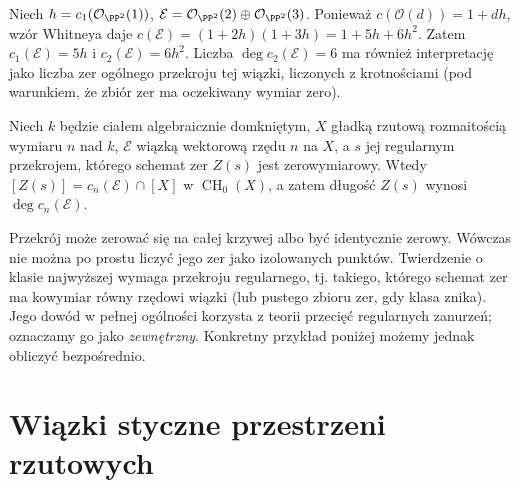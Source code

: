\begin{przyklad}
\label{prz:ga7-chern-sum}
Niech $h=c_1(\mathcal O_{\PP^2}(1))$,
$\mathcal E=\mathcal O_{\PP^2}(2)\oplus\mathcal O_{\PP^2}(3)$.
Ponieważ $c(\mathcal O(d))=1+dh$, wzór Whitneya daje
$c(\mathcal E)=(1+2h)(1+3h)=1+5h+6h^2$.
Zatem $c_1(\mathcal E)=5h$ i $c_2(\mathcal E)=6h^2$.
Liczba $\deg c_2(\mathcal E)=6$ ma również
interpretację jako liczba zer ogólnego przekroju
tej wiązki, liczonych z krotnościami (pod warunkiem,
że zbiór zer ma oczekiwany wymiar zero).
\end{przyklad}

\begin{stwierdzenie}
\label{st:ga7-zero-section}
Niech $k$ będzie ciałem algebraicznie domkniętym,
$X$ gładką rzutową rozmaitością wymiaru $n$ nad $k$,
$\mathcal E$ wiązką wektorową rzędu $n$ na $X$,
a $s$ jej regularnym przekrojem, którego schemat zer
$Z(s)$ jest zerowymiarowy. Wtedy
$[Z(s)]=c_n(\mathcal E)\cap[X]$ w $\operatorname{CH}_0(X)$,
a zatem długość $Z(s)$ wynosi $\deg c_n(\mathcal E)$.
\end{stwierdzenie}
\begin{uwaga}
Przekrój może zerować się na całej krzywej albo
być identycznie zerowy. Wówczas nie można po prostu
liczyć jego zer jako izolowanych punktów. Twierdzenie
o klasie najwyższej wymaga przekroju regularnego,
tj. takiego, którego schemat zer ma kowymiar równy
rzędowi wiązki (lub pustego zbioru zer, gdy klasa znika).
Jego dowód w pełnej ogólności korzysta z teorii
przecięć regularnych zanurzeń; oznaczamy go jako
\emph{zewnętrzny}. Konkretny przykład poniżej
możemy jednak obliczyć bezpośrednio.
\end{uwaga}

\section{Wiązki styczne przestrzeni rzutowych}
\label{sec:ga7-tangent}


